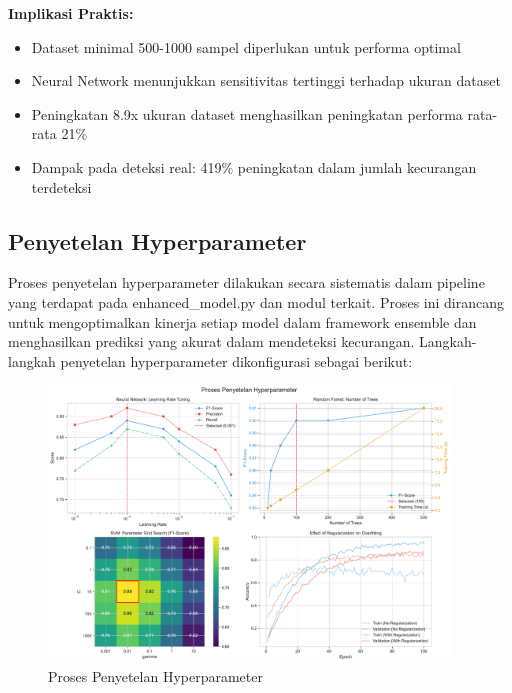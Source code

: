 \textbf{Implikasi Praktis:}
\begin{itemize}
    \item Dataset minimal 500-1000 sampel diperlukan untuk performa optimal
    \item Neural Network menunjukkan sensitivitas tertinggi terhadap ukuran dataset
    \item Peningkatan 8.9x ukuran dataset menghasilkan peningkatan performa rata-rata 21\%
    \item Dampak pada deteksi real: 419\% peningkatan dalam jumlah kecurangan terdeteksi
\end{itemize}

\subsection{Penyetelan Hyperparameter}
\label{subsec:penyetelanHyperparameter}

Proses penyetelan hyperparameter dilakukan secara sistematis dalam pipeline yang terdapat pada enhanced\_model.py dan modul terkait. Proses ini dirancang untuk mengoptimalkan kinerja setiap model dalam framework ensemble dan menghasilkan prediksi yang akurat dalam mendeteksi kecurangan. Langkah-langkah penyetelan hyperparameter dikonfigurasi sebagai berikut:

\begin{figure}[htbp]
    \centering
    \includegraphics[width=0.95\textwidth]{figures/hyperparameter_tuning.pdf}
    \caption{Proses Penyetelan Hyperparameter}
    \label{fig:hyperparameter_tuning}
\end{figure}

